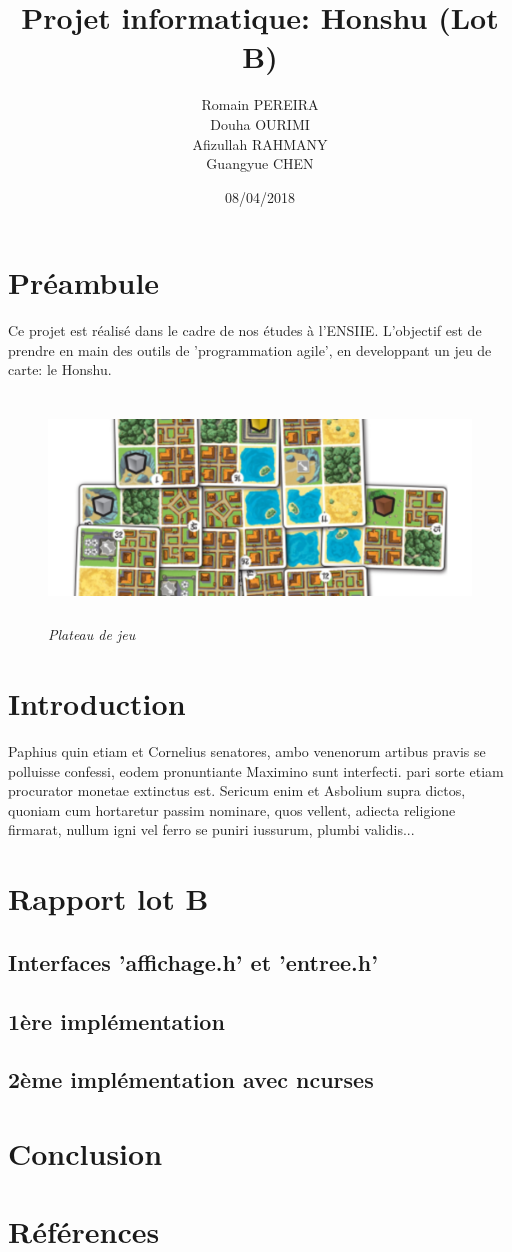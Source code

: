\documentclass[10pt]{article}
\title{Projet informatique: Honshu (Lot B)}
\author{
			Romain PEREIRA\\
			Douha OURIMI\\
			Afizullah RAHMANY\\
			Guangyue CHEN
}
\date{08/04/2018}
\begin{document}
	\maketitle
	\tableofcontents
	
	\newpage
	\section*{Préambule}
		Ce projet est réalisé dans le cadre de nos études à l'ENSIIE.
		L'objectif est de prendre en main des outils de 'programmation agile',
		en developpant un jeu de carte: le Honshu.
	\newline
	\begin{figure}[H]
		\begin{center}
			\includegraphics[height=6cm,keepaspectratio]{../images/honshu.png}
		\end{center}
		\caption{\textit{Plateau de jeu}}
		\label{honshu_introduction}
	\end{figure}

	\section{Introduction}
		Paphius quin etiam et Cornelius senatores, ambo venenorum artibus pravis se polluisse
		confessi, eodem pronuntiante Maximino sunt interfecti. pari sorte etiam procurator monetae
		extinctus est. Sericum enim et Asbolium supra dictos, quoniam cum hortaretur passim nominare,
		quos vellent, adiecta religione firmarat, nullum igni vel ferro se puniri iussurum, plumbi validis...
	\newpage
	\section{Rapport lot B}
		\subsection{Interfaces 'affichage.h' et 'entree.h'}
		\subsection{1ère implémentation}
		\subsection{2ème implémentation avec ncurses}

	\section{Conclusion}

	\newpage
	\section{Références}
		\begin{thebibliography}{}
		\end{thebibliography}
\end{document}

